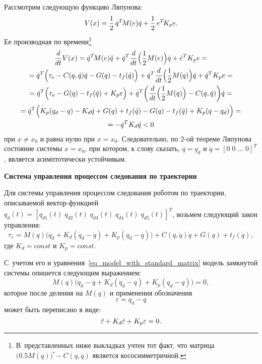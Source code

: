 Рассмотрим следующую функцию Ляпунова:
\begin{equation}
    V(x) = \frac{1}{2} \, \dot{q}^T \! M(e) \dot{q} + \frac{1}{2} \, e^T \! K_p e \ldotp
\end{equation}
Ее производная по времени\footnote{В~представленных ниже выкладках учтен тот факт, что матрица \linebreak $\bigl( 0.5 M(q) \bigr)^\centerdot \!\! - C(q,\dot{q})$ является кососимметричной.}
\begin{gather}
    \frac{d}{dt} V(x) = \dot{q}^T \! M(e) \ddot{q} + \dot{q}^T \frac{d}{dt} \Bigl( \frac{1}{2} M(e) \Bigr) \dot{q} + \dot{e}^T K_p e = \notag \\
    = \dot{q}^T \Bigl( \tau_e - C(q,\dot{q}) \dot{q} - G(q) - t_f(\dot{q}) \Bigr) + \dot{q}^T \frac{d}{dt} \Bigl( \frac{1}{2} M(q) \Bigr) \dot{q} + \dot{q}^T K_p e  = \notag\\
    = \dot{q}^T \Bigl( \tau_e - G(q) - t_f(\dot{q}) + K_p e\Bigr) + \dot{q}^T \biggl( \frac{d}{dt} \Bigl( \frac{1}{2} M(q) \Bigr) - C(q,\dot{q}) \biggr) \dot{q} = \notag \\
    = \dot{q}^T \Bigl(K_p (q_d - q) - K_d \dot{q} + G(q) + t_f(\dot{q}) - G(q) - t_f(\dot{q}) + K_p (q - q_d) \Bigr) = \notag \\
    = -\dot{q}^T K_d \dot{q} < 0
\end{gather}
при $x \ne x_0$ и равна нулю при $x = x_0$.
Следовательно, по 2-ой теореме Ляпунова состояние системы $x = x_0$, при котором, к слову сказать, $q = q_d$ и $\dot{q} = [0\;0\;\ldots\;0]^T$, является асимптотически устойчивым.

\textbf{Система управления процессом следования по траектории}

Для системы управления процессом следования роботом по траектории, описываемой вектор-функцией $q_d(t) = \left[ q_{d1}(t) \; q_{d2}(t) \; q_{d3}(t) \; q_{d4}(t) \; q_{d5}(t) \right]^T$\!\!\!,\; возьмем следующий закон управления:
\begin{equation}\label{eq_trajectory_tracking_control_law}
    \tau_e = M(q) \bigl( \ddot{q}_d + K_d (\dot{q}_d - \dot{q})+  K_p (q_d - q) \bigr) + C(q,\dot{q}) \dot{q} + G(q) + t_f(\dot{q}),
\end{equation}
где $K_d = const$ и $K_p = const$.

С~учетом его и уравнения~\eqref{eq_model_with_standard_matrix} модель замкнутой системы опишется следующим выражением:
\begin{equation}
    M(q) \bigl( \ddot{q}_d - \ddot{q} + K_d (\dot{q}_d - \dot{q})+  K_p (q_d - q) \bigr) = 0,
\end{equation}
которое после деления на $M(q)$ и применения обозначения
\begin{equation}
    \varepsilon = q_d - q
\end{equation}
может быть переписано в виде:
\begin{equation}\label{eq_trajectory_tracking_closed_loop}
    \ddot{\varepsilon} + K_d \dot{\varepsilon} +  K_p \varepsilon = 0 \ldotp
\end{equation}

